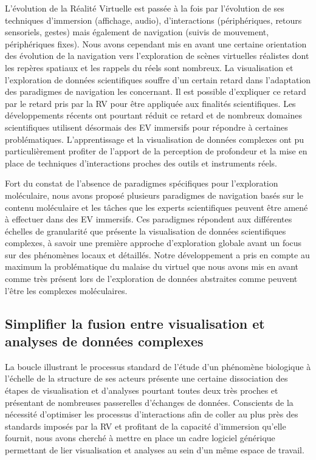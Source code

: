 L'évolution de la Réalité Virtuelle est passée à la fois par l'évolution de ses techniques d'immersion (affichage, audio), d'interactions (périphériques, retours sensoriels, gestes) mais également de navigation (suivis de mouvement, périphériques fixes). 
Nous avons cependant mis en avant une certaine orientation des évolution de la navigation vers l'exploration de scènes virtuelles réalistes dont les repères spatiaux et les rappels du réels sont nombreux. La visualisation et l'exploration de données scientifiques souffre d'un certain retard dans l'adaptation des paradigmes de navigation les concernant. Il est possible d'expliquer ce retard par le retard pris par la RV pour être appliquée aux finalités scientifiques. Les développements récents ont pourtant réduit ce retard et de nombreux domaines scientifiques utilisent désormais des EV immersifs pour répondre à certaines problématiques. L'apprentissage et la visualisation de données complexes ont pu particulièrement profiter de l'apport de la perception de profondeur et la mise en place de techniques d'interactions proches des outils et instruments réels.

Fort du constat de l'absence de paradigmes spécifiques pour l'exploration moléculaire, nous avons proposé plusieurs paradigmes de navigation basés sur le contenu moléculaire et les tâches que les experts scientifiques peuvent être amené à effectuer dans des EV immersifs. Ces paradigmes répondent aux différentes échelles de granularité que présente la visualisation de données scientifiques complexes, à savoir une première approche d'exploration globale avant un focus sur des phénomènes locaux et détaillés. Notre développement a pris en compte au maximum la problématique du malaise du virtuel que nous avons mis en avant comme très présent lors de l'exploration de données abstraites comme peuvent l'être les complexes moléculaires.

\subsection*{Simplifier la fusion entre visualisation et analyses de données complexes}

La boucle illustrant le processus standard de l'étude d'un phénomène biologique à l'échelle de la structure de ses acteurs présente une certaine dissociation des étapes de visualisation et d'analyses pourtant toutes deux très proches et présentant de nombreuses passerelles d'échanges de données. Conscients de la nécessité d'optimiser les processus d'interactions afin de coller au plus près des standards imposés par la RV et profitant de la capacité d'immersion qu'elle fournit, nous avons cherché à mettre en place un cadre logiciel générique permettant de lier visualisation et analyses au sein d'un même espace de travail.

